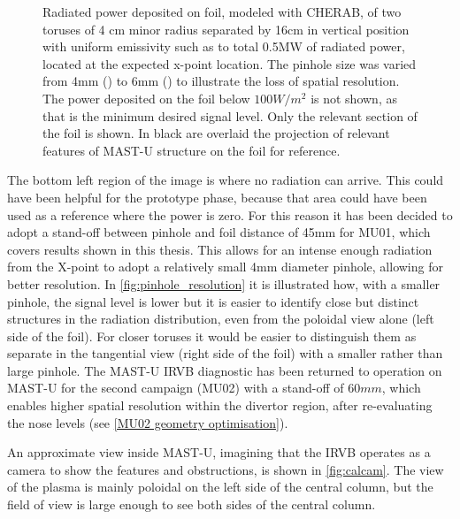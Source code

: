 \begin{figure}
\begin{subfigure}{0.7\linewidth}
         \caption{}
         \label{fig:pinhole_resolution6}
     \end{subfigure}
	\caption{Radiated power deposited on foil, modeled with CHERAB, of two toruses of 4 cm minor radius separated by 16cm in vertical position with uniform emissivity such as to total 0.5MW of radiated power, located at the expected x-point location. The pinhole size was varied from 4mm () to 6mm () to illustrate the loss of spatial resolution. The power deposited on the foil below $100W/m^2$ is not shown, as that is the minimum desired signal level. Only the relevant section of the foil is shown. In black are overlaid the projection of relevant features of MAST-U structure on the foil for reference.}
    \label{fig:pinhole_resolution}
\end{figure}


The bottom left region of the image is where no radiation can arrive. This could have been helpful for the prototype phase, because that area could have been used as a reference where the power is zero.
For this reason it has been decided to adopt a stand-off between pinhole and foil distance of 45mm for MU01, which covers results shown in this thesis. This allows for an intense enough radiation from the X-point to adopt a relatively small 4mm diameter pinhole, allowing for better resolution. In \autoref{fig:pinhole_resolution} it is illustrated how, with a smaller pinhole, the signal level is lower but it is easier to identify close but distinct structures in the radiation distribution, even from the poloidal view alone (left side of the foil). For closer toruses it would be easier to distinguish them as separate in the tangential view (right side of the foil) with a smaller rather than large pinhole. The MAST-U IRVB diagnostic has been returned to operation on MAST-U for the second campaign (MU02) with a stand-off of $60mm$, which enables higher spatial resolution within the divertor region, after re-evaluating the nose levels (see \autoref{MU02 geometry optimisation}).

An approximate view inside MAST-U, imagining that the IRVB operates as a camera to show the features and obstructions, is shown in \autoref{fig:calcam}. The view of the plasma is mainly poloidal on the left side of the central column, but the field of view is large enough to see both sides of the central column.

